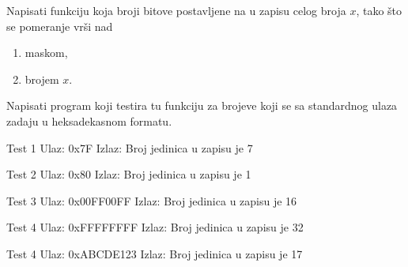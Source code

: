 \begin{Exercise}[label=202]
 Napisati funkciju koja broji bitove postavljene na  u zapisu celog broja $x$, tako što se pomeranje vrši nad
\begin{enumerate}
\item maskom,
\item brojem $x$.
\end{enumerate} 
 
 Napisati program koji testira tu funkciju za brojeve koji se sa standardnog ulaza zadaju u heksadekasnom formatu.

\begin{miditest}
\begin{test}{Test 1}
Ulaz:   0x7F  
Izlaz:  
  Broj jedinica u zapisu je  7   
\end{test}
\end{miditest}
\begin{miditest}
\begin{test}{Test 2}
Ulaz:   0x80
Izlaz:  
  Broj jedinica u zapisu je 1
\end{test}
\end{miditest}

\begin{miditest}
\begin{test}{Test 3}
Ulaz:   0x00FF00FF
Izlaz:  
  Broj jedinica u zapisu je 16
\end{test}
\end{miditest}
\begin{miditest}
\begin{test}{Test 4}
Ulaz:   0xFFFFFFFF
Izlaz:  
  Broj jedinica u zapisu je 32
\end{test}
\end{miditest}

\begin{miditest}
\begin{test}{Test 4}
Ulaz:   0xABCDE123
Izlaz:  
  Broj jedinica u zapisu je 17
\end{test}
\end{miditest}

\end{Exercise}
\begin{Answer}[ref=202]
\end{Answer}


